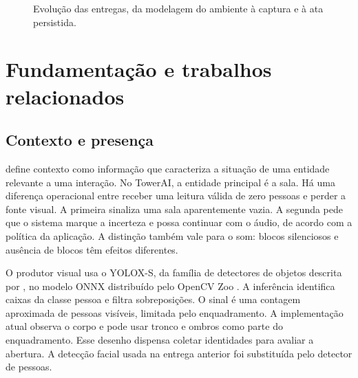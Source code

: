 \documentclass[12pt]{article}
\begin{document}
\begin{figure}[htbp]
\centering
{}
\caption{Evolução das entregas, da modelagem do ambiente à captura e à ata persistida.}
\label{fig:evolucao}
\end{figure}

\section{Fundamentação e trabalhos relacionados}

\subsection{Contexto e presença}

\cite{dey2001} define contexto como informação que caracteriza a situação de uma entidade relevante a uma interação. No TowerAI, a entidade principal é a sala. Há uma diferença operacional entre receber uma leitura válida de zero pessoas e perder a fonte visual. A primeira sinaliza uma sala aparentemente vazia. A segunda pede que o sistema marque a incerteza e possa continuar com o áudio, de acordo com a política da aplicação. A distinção também vale para o som: blocos silenciosos e ausência de blocos têm efeitos diferentes.

O produtor visual usa o YOLOX-S, da família de detectores de objetos descrita por \cite{ge2021}, no modelo ONNX distribuído pelo OpenCV Zoo \cite{opencvzoo}. A inferência identifica caixas da classe pessoa e filtra sobreposições. O sinal é uma contagem aproximada de pessoas visíveis, limitada pelo enquadramento. A implementação atual observa o corpo e pode usar tronco e ombros como parte do enquadramento. Esse desenho dispensa coletar identidades para avaliar a abertura. A detecção facial usada na entrega anterior foi substituída pelo detector de pessoas.
\end{document}

